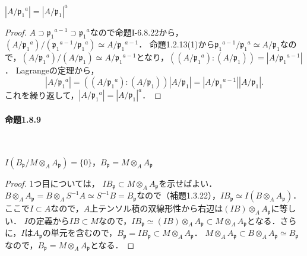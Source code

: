 \begin{screen}\label{order_prime_power}
  $|A/\mathfrak{p}_1{}^a| = |A/\mathfrak{p}_1|^a$
\end{screen}
\begin{proof}
  $A\supset\mathfrak{p}_1{}^{a-1}\supset\mathfrak{p}_1{}^a$なので命題I-6.8.22から，$(A/\mathfrak{p}_1{}^a)/(\mathfrak{p}_1{}^{a-1}/\mathfrak{p}_1{}^a)\simeq A/\mathfrak{p}_1{}^{a-1}$．
  命題1.2.13(1)から$\mathfrak{p}_1{}^{a-1}/\mathfrak{p}_1{}^a\simeq A/\mathfrak{p}_1$なので，$(A/\mathfrak{p}_1{}^a)/(A/\mathfrak{p}_1)\simeq A/\mathfrak{p}_1{}^{a-1}$となり，$((A/\mathfrak{p}_1{^a}):(A/\mathfrak{p}_1)) = |A/\mathfrak{p}_1{}^{a-1}|$．
  Lagrangeの定理から，
  \[|A/\mathfrak{p}_1{}^a| = ((A/\mathfrak{p}_1{^a}):(A/\mathfrak{p}_1))|A/\mathfrak{p}_1| = |A/\mathfrak{p}_1{}^{a-1}||A/\mathfrak{p}_1|.\]
  これを繰り返して，$|A/\mathfrak{p}_1{}^a| = |A/\mathfrak{p}_1|^a$．
\end{proof}

\paragraph{命題1.8.9}~
\begin{screen}
  $I(B_\mathfrak{p}/M\otimes_AA_\mathfrak{p}) = \{0\}$，$B_\mathfrak{p} = M \otimes_A A_\mathfrak{p}$
\end{screen}
\begin{proof}
  1つ目については， $IB_\mathfrak{p} \subset M \otimes_A A_\mathfrak{p}$を示せばよい．
  $B \otimes_A A_\mathfrak{p} = B \otimes_A S^{-1}A \simeq S^{-1}B = B_\mathfrak{p}$なので（補題1.3.22），$IB_\mathfrak{p} \simeq I(B \otimes_A A_\mathfrak{p})$．ここで$I\subset A$なので，$A$上テンソル積の双線形性から右辺は$(IB) \otimes_A A_\mathfrak{p}$に等しい．
  $I$の定義から$IB \subset M$なので，$IB_\mathfrak{p} \simeq (IB) \otimes_A A_\mathfrak{p} \subset M \otimes_A A_\mathfrak{p}$となる．さらに，$I$は$A_\mathfrak{p}$の単元を含むので，$B_\mathfrak{p} = IB_\mathfrak{p} \subset M \otimes_A A_\mathfrak{p}$．
  $M \otimes_A A_\mathfrak{p} \subset B \otimes_A A_\mathfrak{p} \simeq B_\mathfrak{p}$なので，$B_\mathfrak{p} = M \otimes_A A_\mathfrak{p}$となる．
\end{proof}


